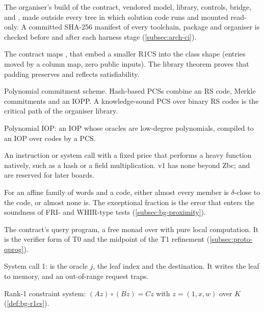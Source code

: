 \begin{description}[leftmargin=0pt,itemsep=2pt,parsep=0pt,font=\normalfont\bfseries]
\item[Organiser package; manifest.] The organiser's build of the contract, vendored model, library,
  controls, bridge,  and , made outside every tree in which solution
  code runs and mounted read-only. A committed SHA-256 manifest of every toolchain, package and
  organiser  is checked before and after each harness stage (\cref{subsec:arch-ci}).

\item[pad.] The contract maps ,  that embed a smaller R1CS into
  the class shape (entries moved by a column map, zero public inputs). The library theorem
   proves that padding preserves and reflects satisfiability.

\item[PCS.] Polynomial commitment scheme. Hash-based PCSs combine an RS code, Merkle commitments and
  an IOPP. A knowledge-sound PCS over binary RS codes is the critical path of the organiser library.

\item[PIOP.] Polynomial IOP: an IOP whose oracles are low-degree polynomials, compiled to an IOP over
  codes by a PCS.

\item[Precompile.] An instruction or system call with a fixed price that performs a heavy function
  natively, such as a hash or a field multiplication. v1 has none beyond Zbc;  and
   are reserved for later boards.

\item[Proximity gap.] For an affine family of words and a code, either almost every member is
  $\delta$-close to the code, or almost none is. The exceptional fraction is the error that enters
  the soundness of FRI- and WHIR-type tests \cite{BCIKS20} (\cref{subsec:bg-proximity}).

\item[QProg.] The contract's query program, a free monad over  with pure local
  computation. It is the verifier form of T0 and the midpoint of the T1 refinement
  (\cref{subsec:proto-qprog}).

\item[QUERY.] System call 1:  is the oracle $j$,  the leaf index and  the
  destination. It writes the leaf to memory, and an out-of-range request traps.

\item[R1CS.] Rank-1 constraint system: $(Az)\circ(Bz)=Cz$ with $z=(1,x,w)$ over $K$
  (\cref{def:bg-r1cs}).


\end{description}
